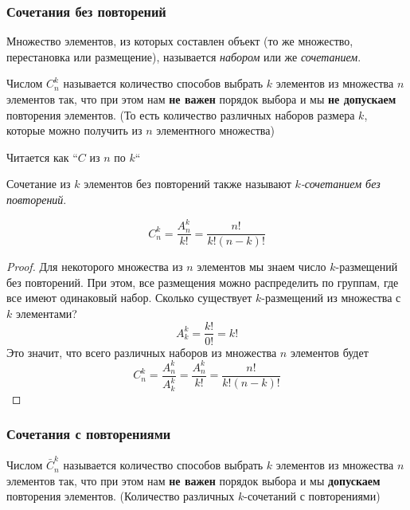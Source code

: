 \subsubsection*{Сочетания без повторений}

\begin{definition}
	Множество элементов, из которых составлен объект (то же множество, перестановка или размещение), называется \textit{набором} или же \textit{сочетанием}.
\end{definition}

\begin{definition}
	Числом $C_n^k$ называется количество способов выбрать $k$ элементов из множества $n$ элементов так, что при этом нам \textbf{не важен} порядок выбора и мы \textbf{не допускаем} повторения элементов. (То есть количество различных наборов размера $k$, которые можно получить из $n$ элементного множества)
\end{definition}

\begin{note}
	Читается как ``$C$ из $n$ по $k$``
\end{note}

\begin{note}
	Сочетание из $k$ элементов без повторений также называют \textit{$k$-сочетанием без повторений}.
\end{note}

\begin{theorem}
	\[
		C_n^k = \frac{A_n^k}{k!} = \frac{n!}{k! (n - k)!}
	\]
\end{theorem}

\begin{proof}
	Для некоторого множества из $n$ элементов мы знаем число $k$-размещений без повторений. При этом, все размещения можно распределить по группам, где все имеют одинаковый набор. Сколько существует $k$-размещений из множества с $k$ элементами?
	\[
		A_k^k = \frac{k!}{0!} = k!
	\]
	Это значит, что всего различных наборов из множества $n$ элементов будет
	\[
		C_n^k = \frac{A_n^k}{A_k^k} = \frac{A_n^k}{k!} = \frac{n!}{k! (n - k)!}
	\]
\end{proof}

\subsubsection*{Сочетания с повторениями}

\begin{definition}
	Числом $\bar{C}_n^k$ называется количество способов выбрать $k$ элементов из множества $n$ элементов так, что при этом нам \textbf{не важен} порядок выбора и мы \textbf{допускаем} повторения элементов. (Количество различных $k$-сочетаний с повторениями)
\end{definition}

